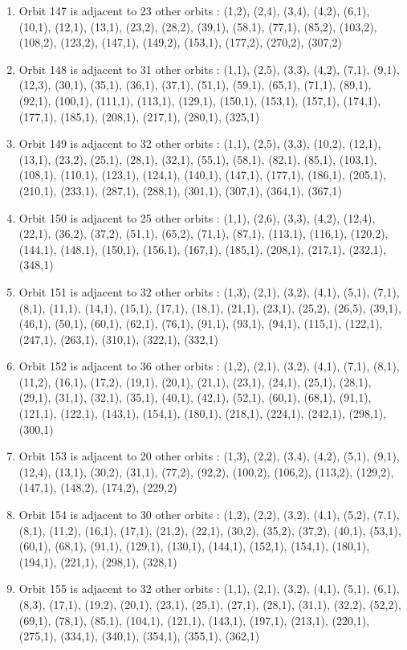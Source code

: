 \documentclass[12pt]{article}
\begin{document}
\begin{enumerate}
\item Orbit 147 is adjacent to 23 other orbits : (1,2), (2,4), (3,4), (4,2), (6,1), (10,1), (12,1), (13,1), (23,2), (28,2), (39,1), (58,1), (77,1), (85,2), (103,2), (108,2), (123,2), (147,1), (149,2), (153,1), (177,2), (270,2), (307,2)
\item Orbit 148 is adjacent to 31 other orbits : (1,1), (2,5), (3,3), (4,2), (7,1), (9,1), (12,3), (30,1), (35,1), (36,1), (37,1), (51,1), (59,1), (65,1), (71,1), (89,1), (92,1), (100,1), (111,1), (113,1), (129,1), (150,1), (153,1), (157,1), (174,1), (177,1), (185,1), (208,1), (217,1), (280,1), (325,1)
\item Orbit 149 is adjacent to 32 other orbits : (1,1), (2,5), (3,3), (10,2), (12,1), (13,1), (23,2), (25,1), (28,1), (32,1), (55,1), (58,1), (82,1), (85,1), (103,1), (108,1), (110,1), (123,1), (124,1), (140,1), (147,1), (177,1), (186,1), (205,1), (210,1), (233,1), (287,1), (288,1), (301,1), (307,1), (364,1), (367,1)
\item Orbit 150 is adjacent to 25 other orbits : (1,1), (2,6), (3,3), (4,2), (12,4), (22,1), (36,2), (37,2), (51,1), (65,2), (71,1), (87,1), (113,1), (116,1), (120,2), (144,1), (148,1), (150,1), (156,1), (167,1), (185,1), (208,1), (217,1), (232,1), (348,1)
\item Orbit 151 is adjacent to 32 other orbits : (1,3), (2,1), (3,2), (4,1), (5,1), (7,1), (8,1), (11,1), (14,1), (15,1), (17,1), (18,1), (21,1), (23,1), (25,2), (26,5), (39,1), (46,1), (50,1), (60,1), (62,1), (76,1), (91,1), (93,1), (94,1), (115,1), (122,1), (247,1), (263,1), (310,1), (322,1), (332,1)
\item Orbit 152 is adjacent to 36 other orbits : (1,2), (2,1), (3,2), (4,1), (7,1), (8,1), (11,2), (16,1), (17,2), (19,1), (20,1), (21,1), (23,1), (24,1), (25,1), (28,1), (29,1), (31,1), (32,1), (35,1), (40,1), (42,1), (52,1), (60,1), (68,1), (91,1), (121,1), (122,1), (143,1), (154,1), (180,1), (218,1), (224,1), (242,1), (298,1), (300,1)
\item Orbit 153 is adjacent to 20 other orbits : (1,3), (2,2), (3,4), (4,2), (5,1), (9,1), (12,4), (13,1), (30,2), (31,1), (77,2), (92,2), (100,2), (106,2), (113,2), (129,2), (147,1), (148,2), (174,2), (229,2)
\item Orbit 154 is adjacent to 30 other orbits : (1,2), (2,2), (3,2), (4,1), (5,2), (7,1), (8,1), (11,2), (16,1), (17,1), (21,2), (22,1), (30,2), (35,2), (37,2), (40,1), (53,1), (60,1), (68,1), (91,1), (129,1), (130,1), (144,1), (152,1), (154,1), (180,1), (194,1), (221,1), (298,1), (328,1)
\item Orbit 155 is adjacent to 32 other orbits : (1,1), (2,1), (3,2), (4,1), (5,1), (6,1), (8,3), (17,1), (19,2), (20,1), (23,1), (25,1), (27,1), (28,1), (31,1), (32,2), (52,2), (69,1), (78,1), (85,1), (104,1), (121,1), (143,1), (197,1), (213,1), (220,1), (275,1), (334,1), (340,1), (354,1), (355,1), (362,1)

\end{enumerate}
\end{document}
